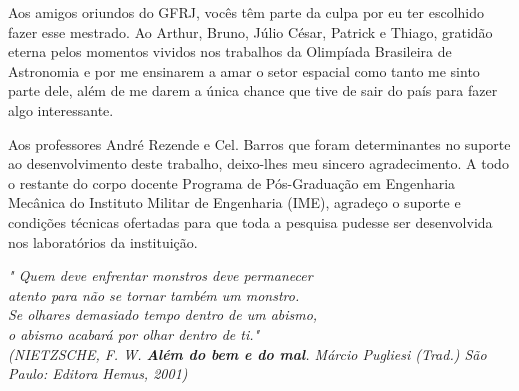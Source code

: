 \begin{agradecimentos}
Aos amigos oriundos do GFRJ, vocês têm parte da culpa por eu ter escolhido fazer esse mestrado. Ao Arthur, Bruno, Júlio César, Patrick e Thiago, gratidão eterna pelos momentos vividos nos trabalhos da Olimpíada Brasileira de Astronomia e por me ensinarem a amar o setor espacial como tanto me sinto parte dele, além de me darem a única chance que tive de sair do país para fazer algo interessante. 

Aos professores André Rezende e Cel. Barros que foram determinantes no suporte ao desenvolvimento deste trabalho, deixo-lhes meu sincero agradecimento. A todo o restante do corpo docente Programa de Pós-Graduação em Engenharia Mecânica do Instituto Militar de Engenharia (IME), agradeço o suporte e condições técnicas ofertadas para que toda a pesquisa pudesse ser desenvolvida nos laboratórios da instituição.

\end{agradecimentos}

\begin{epigrafe}
    \vspace*{\fill}
	\begin{flushright}
		\textit{"
		Quem deve enfrentar monstros deve permanecer\\
		atento para não se tornar também um monstro. \\
		Se olhares demasiado tempo dentro de um abismo, \\
		o abismo acabará por olhar dentro de ti." \\
		(NIETZSCHE, F. W. \textbf{Além do bem e do mal}. Márcio Pugliesi (Trad.) São Paulo: Editora Hemus, 2001)}
	\end{flushright}
\end{epigrafe}


